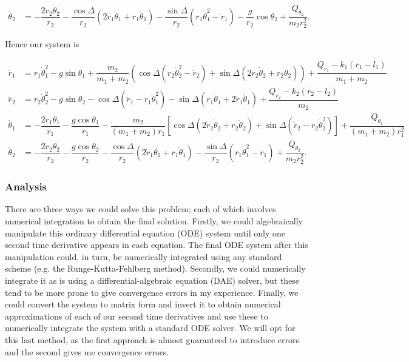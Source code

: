 \documentclass[12pt,a4paper,portrait]{article}
\begin{document}
\begin{landscape}
\begin{align}
	\ddot{\theta}_2 &= -\dfrac{2\dot{r}_2\dot{\theta}_2}{r_2} - \dfrac{\cos{\Delta}}{r_2}(2\dot{r}_1\dot{\theta}_1+r_1\ddot{\theta}_1) - \dfrac{\sin{\Delta}}{r_2}(r_1\dot{\theta}_1^2 - \ddot{r}_1) - \dfrac{g}{r_2}\cos{\theta_2} + \dfrac{Q_{\theta_2}}{m_2r_2^2}.\label{theta2ddotinit}
\end{align}

Hence our system is

\begin{align*}
	\ddot{r}_1 &= r_1\dot{\theta}_1^2-g\sin{\theta_1} + \dfrac{m_2}{m_1+m_2}\left(\cos{\Delta}(r_2\dot{\theta}_2^2 -\ddot{r}_2) + \sin{\Delta}(2\dot{r}_2\dot{\theta}_2+r_2\ddot{\theta}_2)\right)  + \dfrac{Q_{r_1}-k_1(r_1-l_1)}{m_1+m_2}\\
	\ddot{r}_2 &=r_2\dot{\theta}_2^2-g\sin{\theta_2}- \cos{\Delta}(\ddot{r}_1 - r_1\dot{\theta}_1^2) - \sin{\Delta}(r_1\ddot{\theta}_1 + 2\dot{r}_1\dot{\theta}_1) + \dfrac{Q_{r_2}-k_2(r_2-l_2)}{m_2}\\
	\ddot{\theta}_1 &= -\dfrac{2\dot{r}_1\dot{\theta}_1}{r_1} - \dfrac{g\cos{\theta_1}}{r_1} - \dfrac{m_2}{(m_1+m_2)r_1}\left[\cos{\Delta}(2\dot{r}_2\dot{\theta}_2+r_2\ddot{\theta}_2) +\sin{\Delta}(\ddot{r}_2-r_2\dot{\theta}_2^2)\right] + \dfrac{Q_{\theta_1}}{(m_1+m_2)r_1^2}\\
	\ddot{\theta}_2 &= -\dfrac{2\dot{r}_2\dot{\theta}_2}{r_2}- \dfrac{g\cos{\theta_2}}{r_2} - \dfrac{\cos{\Delta}}{r_2}(2\dot{r}_1\dot{\theta}_1+r_1\ddot{\theta}_1) - \dfrac{\sin{\Delta}}{r_2}(r_1\dot{\theta}_1^2 - \ddot{r}_1) + \dfrac{Q_{\theta_2}}{m_2r_2^2}.
\end{align*}

\subsubsection{Analysis}
There are three ways we could solve this problem; each of which involves numerical integration to obtain the final solution. Firstly, we could algebraically manipulate this ordinary differential equation (ODE) system until only one second time derivative appears in each equation. The final ODE system after this manipulation could, in turn, be numerically integrated using any standard scheme (e.g. the Runge-Kutta-Fehlberg method). Secondly, we could numerically integrate it as is using a differential-algebraic equation (DAE) solver, but these tend to be more prone to give convergence errors in my experience. Finally, we could convert the system to matrix form and invert it to obtain numerical approximations of each of our second time derivatives and use these to numerically integrate the system with a standard ODE solver. We will opt for this last method, as the first approach is almost guaranteed to introduce errors and the second gives me convergence errors. 


\end{landscape}
\end{document}
